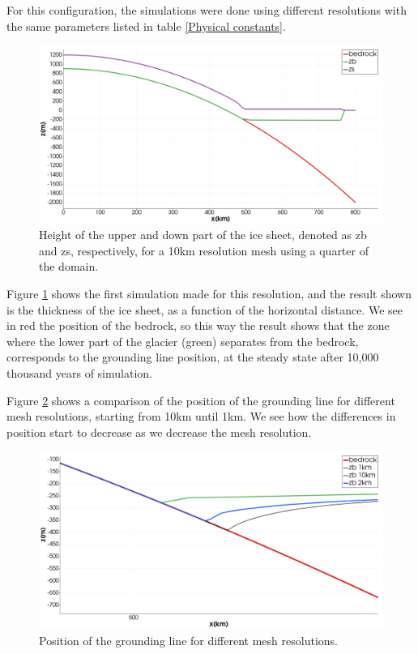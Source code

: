 \documentclass{article}
\begin{document}
For this configuration, the simulations were done using different resolutions with the same parameters listed in table \ref{Physical constants}. 
	\begin{figure}[!h]
		\centering
		\includegraphics[width=0.8\linewidth]{../fig/zb_zs_10km_cone.png}
		\caption{Height of the upper and down part of the ice sheet, denoted as zb and zs, respectively, for a 10km resolution mesh using a quarter of the domain.}
		\label{zb_zs_10km}
	\end{figure}
Figure \ref{zb_zs_10km} shows the first simulation made for this resolution, and the result shown is the thickness of the ice sheet, as a function of the horizontal distance. We see in red the position of the bedrock, so this way the result shows that the zone where the lower part of the glacier (green) separates from the bedrock, corresponds to the grounding line position, at the steady state after 10,000 thousand years of simulation.  

Figure \ref{zb_10km_2km_1km} shows a comparison of the position of the grounding line for different mesh resolutions, starting from 10km until 1km. We see how the differences in position start to decrease as we decrease the mesh resolution. 
	\begin{figure}[!h]
		\centering
		\includegraphics[width=0.8\linewidth]{../fig/zb_10km_2km_1km.png}
		\caption{Position of the grounding line for different mesh resolutions.}
		\label{zb_10km_2km_1km}
	\end{figure}
 
\end{document}
